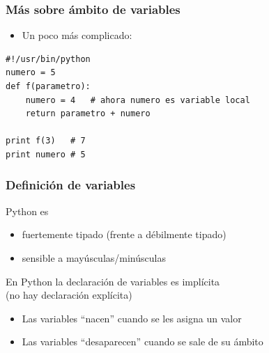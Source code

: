 \documentclass{beamer}
\begin{document}
\begin{frame}[fragile]
\frametitle{Más sobre ámbito de variables}
\begin{itemize}
  
\item  Un poco más complicado:

\end{itemize}


  \begin{footnotesize}
\begin{verbatim}
#!/usr/bin/python
numero = 5
def f(parametro):
    numero = 4   # ahora numero es variable local
    return parametro + numero
    
print f(3)   # 7
print numero # 5

\end{verbatim}
  \end{footnotesize}

\end{frame}




\begin{frame}
\frametitle{Definición de variables}

Python es
\begin{itemize}
\item fuertemente tipado (frente a débilmente tipado)
\item sensible a mayúsculas/minúsculas
\end{itemize}



En Python la declaración de variables es implícita \\(no hay declaración explícita)
\begin{itemize}
\item Las variables ``nacen'' cuando se les asigna un valor
\item Las variables ``desaparecen'' cuando se sale de su ámbito
\end{itemize}  
\end{frame}
\end{document}
